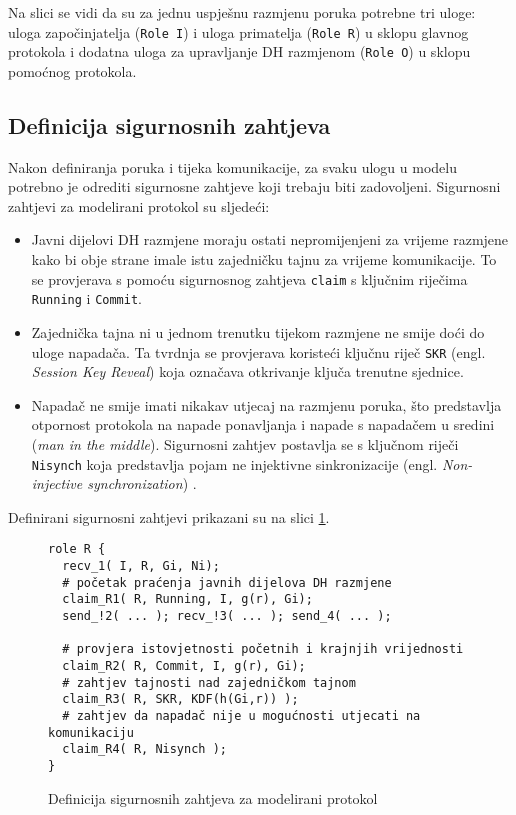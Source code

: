 Na slici se vidi da su za jednu uspješnu razmjenu
poruka potrebne tri uloge: uloga započinjatelja (\texttt{Role I}) i uloga
primatelja (\texttt{Role R}) u sklopu glavnog protokola i dodatna uloga za
upravljanje DH razmjenom (\texttt{Role O}) u sklopu pomoćnog protokola.

\subsection{Definicija sigurnosnih zahtjeva}

Nakon definiranja poruka i tijeka komunikacije, za svaku ulogu u modelu potrebno
je
odrediti sigurnosne zahtjeve koji trebaju biti zadovoljeni. Sigurnosni zahtjevi
za modelirani protokol su sljedeći:
\begin{itemize}
    \item Javni dijelovi DH razmjene moraju ostati nepromijenjeni za vrijeme
	razmjene kako bi obje strane imale istu zajedničku tajnu za vrijeme
	komunikacije. To se provjerava s pomoću sigurnosnog zahtjeva
	\texttt{claim} s ključnim riječima \texttt{Running} i \texttt{Commit}.
    \item Zajednička tajna ni u jednom trenutku tijekom razmjene ne smije doći do
	uloge napadača. Ta tvrdnja se provjerava koristeći ključnu riječ
	\texttt{SKR} (engl. \emph{Session Key Reveal}) koja označava otkrivanje ključa
	trenutne sjednice.
    \item Napadač ne smije imati nikakav utjecaj na razmjenu poruka, što
	predstavlja otpornost protokola na napade ponavljanja i napade s
	napadačem u sredini (\emph{man in the middle}). Sigurnosni zahtjev
	postavlja se s ključnom riječi \texttt{Nisynch} koja predstavlja pojam ne
	injektivne sinkronizacije (engl. \emph{Non-injective synchronization})
	\cite{scyther_book}.
\end{itemize}

Definirani sigurnosni zahtjevi prikazani su na slici \ref{fig:claims}.

\begin{figure}[htb]
\begin{small}
\begin{verbatim}
role R {
  recv_1( I, R, Gi, Ni);
  # početak praćenja javnih dijelova DH razmjene
  claim_R1( R, Running, I, g(r), Gi);
  send_!2( ... ); recv_!3( ... ); send_4( ... );

  # provjera istovjetnosti početnih i krajnjih vrijednosti
  claim_R2( R, Commit, I, g(r), Gi);
  # zahtjev tajnosti nad zajedničkom tajnom
  claim_R3( R, SKR, KDF(h(Gi,r)) );
  # zahtjev da napadač nije u mogućnosti utjecati na komunikaciju
  claim_R4( R, Nisynch );
}
\end{verbatim}
\end{small}
\vspace{-15pt}
\caption{Definicija sigurnosnih zahtjeva za modelirani protokol}
\label{fig:claims}
\end{figure}
\vspace{-10pt}

